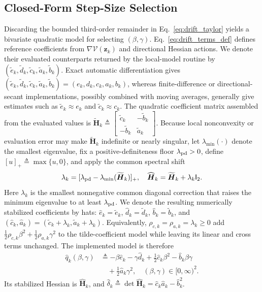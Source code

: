 \documentclass{article}
\theoremstyle{remark}
\newcommand{\Id}{\mathsf{I}}
\newcommand{\bz}{\boldsymbol{z}}
\newcommand{\bH}{\boldsymbol{H}}
\newcommand{\Vk}{\mathcal{V}}
\begin{document}
\subsection{Closed-Form Step-Size Selection}\label{subsec:closed_form}
Discarding the bounded third-order remainder in Eq.~\eqref{eq:drift_taylor} yields a bivariate quadratic model for selecting $(\beta,\gamma)$.
Eq.~\eqref{eq:drift_terms_def} defines reference coefficients from $\nabla\Vk(\bz_k)$ and directional Hessian actions.
We denote their evaluated counterparts returned by the local-model routine by $(\tilde e_k,\tilde d_k,\tilde c_k,\tilde a_k,\tilde b_k)$.
Exact automatic differentiation gives $(\tilde e_k,\tilde d_k,\tilde c_k,\tilde a_k,\tilde b_k)=(e_k,d_k,c_k,a_k,b_k)$, whereas finite-difference or directional-secant implementations, possibly combined with moving averages, generally give estimates such as $\tilde e_k\approx e_k$ and $\tilde c_k\approx c_k$.
The quadratic coefficient matrix assembled from the evaluated values is $\widetilde{\bH}_k\triangleq\left[\begin{smallmatrix}\tilde c_k&-\tilde b_k\\-\tilde b_k&\tilde a_k\end{smallmatrix}\right]$.
Because local nonconvexity or evaluation error may make $\widetilde{\bH}_k$ indefinite or nearly singular, let $\lambda_{\min}(\cdot)$ denote the smallest eigenvalue, fix a positive-definiteness floor $\lambda_{\rm pd}>0$, define $[u]_+\triangleq\max\{u,0\}$, and apply the common spectral shift
\begin{equation}\label{eq:spectral_shift}
\lambda_k=[\lambda_{\rm pd}-\lambda_{\min}(\widetilde{\bH}_k)]_+,
\quad
\widehat{\bH}_k=\widetilde{\bH}_k+\lambda_k\Id_2.
\end{equation}
Here $\lambda_k$ is the smallest nonnegative common diagonal correction that raises the minimum eigenvalue to at least $\lambda_{\rm pd}$.
We denote the resulting numerically stabilized coefficients by hats: $\hat e_k=\tilde e_k$, $\hat d_k=\tilde d_k$, $\hat b_k=\tilde b_k$, and $(\hat c_k,\hat a_k)=(\tilde c_k+\lambda_k,\tilde a_k+\lambda_k)$.
Equivalently, $\rho_{c,k}=\rho_{a,k}=\lambda_k\ge0$ add $\tfrac12\rho_{c,k}\beta^2+\tfrac12\rho_{a,k}\gamma^2$ to the tilde-coefficient model while leaving its linear and cross terms unchanged.
The implemented model is therefore
\begin{equation}\label{eq:qhat}
\begin{aligned}
\hat q_{k}(\beta,\gamma)
&\triangleq
-\beta\hat e_{k}-\gamma\hat d_{k}
+\tfrac{1}{2}\hat c_{k}\beta^{2}-\hat b_{k}\beta\gamma\\
&\quad+\tfrac{1}{2}\hat a_{k}\gamma^{2},
\quad (\beta,\gamma)\in[0,\infty)^{2}.
\end{aligned}
\end{equation}
Its stabilized Hessian is $\widehat{\bH}_k$, and $\hat\delta_k\triangleq\det\widehat{\bH}_k=\hat c_k\hat a_k-\hat b_k^2$.
\end{document}
